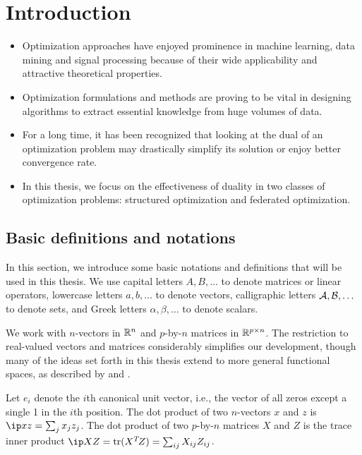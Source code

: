 \chapter{Introduction}
\label{ch:Introduction}

\begin{itemize}
    \item Optimization approaches have enjoyed prominence in machine learning, data mining and signal processing because of their wide applicability and attractive theoretical properties.
    \item Optimization formulations and methods are proving to be vital in designing algorithms to extract essential knowledge from huge volumes of data. 
    \item For a long time, it has been recognized that looking at the dual of an optimization problem may drastically simplify its solution or enjoy better convergence rate.
    \item In this thesis, we focus on the effectiveness of duality in two classes of optimization problems: structured optimization and federated optimization. 
\end{itemize}

  

\section{Basic definitions and notations} \label{sec:1-1}

In this section, we introduce some basic notations and definitions that will be used in this thesis. We use capital letters $A, B, \dots$ to denote matrices or linear operators, lowercase letters $a, b, \dots$ to denote vectors, calligraphic letters $\mathcal{A}, \mathcal{B}, \dots$ to denote sets, and Greek letters $\alpha, \beta, \dots$ to denote scalars.

We work with $n$-vectors in $\mathbb{R}^n$ and $p$-by-$n$ matrices in $\mathbb{R}^{p\times
n}$. The restriction to real-valued vectors and matrices considerably simplifies
our development, though many of the ideas set forth in this thesis extend to
more general functional spaces, as described by \citet{zalinescu2002convex} and
\citet{bauschke2011convex}.

Let $e_i$ denote the $i$th canonical unit vector, i.e., the vector of all zeros
except a single 1 in the $i$th position. The dot product of two $n$-vectors $x$
and $z$ is $\ip x z = \sum_{j} x_j z_j$. The dot product of two $p$-by-$n$
matrices $X$ and $Z$ is the trace inner product $\ip X Z = \trace(X\T Z) =
\sum_{ij}X_{ij}Z_{ij}$.

